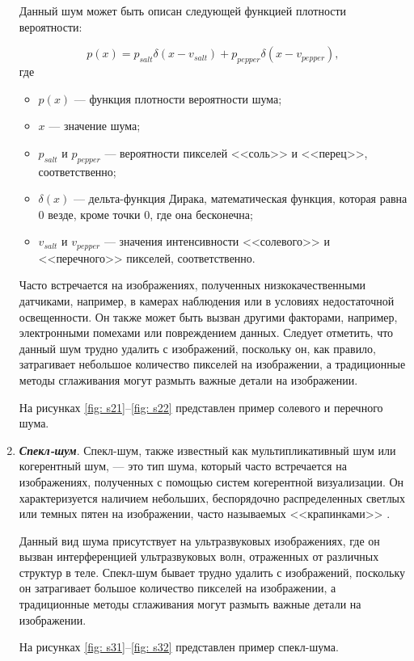 \begin{enumerate}
    Данный шум может быть описан следующей функцией плотности вероятности:

    \begin{equation}
        p(x) = p_{salt} \delta(x - v_{salt}) + p_{pepper} \delta(x - v_{pepper}),
    \end{equation}
    где
    \begin{itemize}
        \item $p(x)$ --- функция плотности вероятности шума;
        \item $x$ --- значение шума;
        \item $p_{salt}$ и $p_{pepper}$ --- вероятности пикселей <<соль>> и <<перец>>, соответственно;
        \item $\delta(x)$ --- дельта-функция Дирака, математическая функция, которая равна 0 везде, кроме точки 0, где она бесконечна;
        \item  $v_{salt}$ и $v_{pepper}$ --- значения интенсивности <<солевого>> и <<перечного>> пикселей, соответственно.
    \end{itemize}
    
    Часто встречается на изображениях, полученных низкокачественными датчиками, например, в камерах наблюдения или в условиях недостаточной освещенности. Он также может быть вызван другими факторами, например, электронными помехами или повреждением данных. Следует отметить, что данный шум трудно удалить с изображений, поскольку он, как правило, затрагивает небольшое количество пикселей на изображении, а традиционные методы сглаживания могут размыть важные детали на изображении.

    На рисунках \ref{fig: s21}--\ref{fig: s22} представлен пример солевого и перечного шума.


    \item \textit{\textbf{Спекл-шум}}. Спекл-шум, также известный как мультипликативный шум или когерентный шум, --- это тип шума, который часто встречается на изображениях, полученных с помощью систем когерентной визуализации. Он характеризуется наличием небольших, беспорядочно распределенных светлых или темных пятен на изображении, часто называемых <<крапинками>> \cite{noisetypes}.
    
    Данный вид шума присутствует на ультразвуковых изображениях, где он вызван интерференцией ультразвуковых волн, отраженных от различных структур в теле. Спекл-шум бывает трудно удалить с изображений, поскольку он затрагивает большое количество пикселей на изображении, а традиционные методы сглаживания могут размыть важные детали на изображении.

    На рисунках \ref{fig: s31}--\ref{fig: s32} представлен пример спекл-шума.

\end{enumerate}


